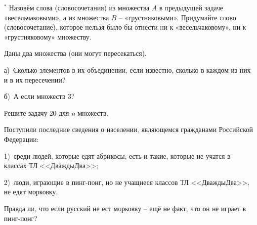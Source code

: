 \begin{thm}$^{\ast}$
Назовём слова (словосочетания) из множества $A$ в предыдущей задаче «весельчаковыми», а из множества $B$ – «грустняковыми». Придумайте слово (словосочетание), которое нельзя было бы отнести ни к «весельчаковому», ни к «грустняковому» множеству.
\end{thm}

\begin{thm}
Даны два множества (они могут пересекаться).
\par
а)~Сколько элементов в их объединении, если
известно, сколько в каждом из них и в их пересечении?
\par
б)~А если множеств 3?
\end{thm}

\begin{thm}
Решите задачу 20 для $n$ множеств.
\end{thm}

\begin{thm}
Поступили последние сведения о населении, являющемся гражданами Российской Федерации:
\par
1)~среди людей, которые едят абрикосы, есть и такие, которые не учатся в классах ТЛ <<ДваждыДва>>;
\par
2)~люди, играющие в пинг-понг, но не учащиеся классов ТЛ <<ДваждыДва>>, не едят морковку.
\par
Правда ли, что если русский не ест морковку – ещё не факт, что он не играет в пинг-понг?
\end{thm}